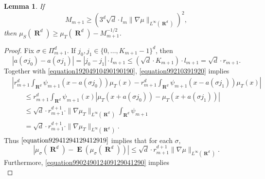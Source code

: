 \documentclass[12pt,reqno]{article}
\numberwithin{equation}{section}
\DeclareMathOperator{\RR}{\mathbf{R}}
\newtheorem{lemma}[theorem]{Lemma}
\DeclareMathOperator{\EE}{\mathbf{E}}
\begin{document}
\begin{lemma} \label{nuNormalizationLemma}
    If
    \begin{equation} \label{equation10491249012}
        M_{m+1} \geq \left( 3^d \sqrt{d} \cdot l_m \| \nabla \mu \|_{L^\infty(\RR^d)} \right)^2,
    \end{equation}
    then $\mu_S(\RR^d) \geq \mu_T(\RR^d) - M_{m+1}^{-1/2}$.
\end{lemma}
\begin{proof}
    Fix $\sigma \in \Pi_{m+1}^d$. If $j_0, j_1 \in \{ 0, \dots, K_{m+1} - 1 \}^d$, then
    \begin{equation} \label{equation99210391920}
        |a(\sigma j_0) - a(\sigma j_1)| = |j_0 - j_1| \cdot l_{m+1} \leq (\sqrt{d} \cdot K_{m+1}) \cdot l_{m+1} = \sqrt{d} \cdot r_{m+1}.
    \end{equation}
    Together with \eqref{equation19204910490190190}, \eqref{equation99210391920} implies
    \begin{equation} \label{equation92941294129412919}
    \begin{split}
        &\left| r_{m+1}^d \int_{\RR^d} \psi_{m+1}(x - a(\sigma j_0)) \mu_T(x) - r_{m+1}^d \int_{\RR^d} \psi_{m+1}(x - a(\sigma j_1)) \mu_T(x) \right|\\
        &\ \ \ \ \ \ \ \ \leq r_{m+1}^d \int_{\RR^d} \psi_{m+1}(x) \left| \mu_T(x + a(\sigma j_0)) - \mu_T(x + a(\sigma j_1)) \right|\\
        &\ \ \ \ \ \ \ \ \leq \sqrt{d} \cdot r_{m+1}^{d+1} \cdot \| \nabla \mu_T \|_{L^\infty(\RR^d)} \int_{\RR^d} \psi_{m+1}\\
        &\ \ \ \ \ \ \ \ = \sqrt{d} \cdot r_{m+1}^{d+1} \cdot \| \nabla \mu_T \|_{L^\infty(\RR^d)}.
    \end{split}
    \end{equation}
    Thus $\eqref{equation92941294129412919}$ implies that for each $\sigma$,
    \begin{equation} \label{equation491040912491}
        |\mu_\sigma(\RR^d) - \EE(\mu_\sigma(\RR^d))| \leq \sqrt{d} \cdot r_{m+1}^{d+1} \| \nabla \mu \|_{L^\infty(\RR^d)}.
    \end{equation}
    Furthermore, \eqref{equation990249012409129041290} implies
    \begin{equation} \label{9921490124912}

\end{equation}
\end{proof}
\end{document}
